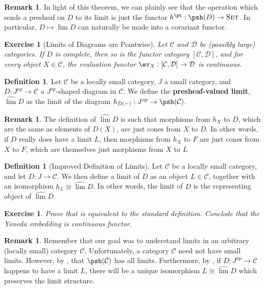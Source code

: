 \documentclass[11pt]{article}
\theoremstyle{plain}
\newtheorem{exrc}[thm]{Exercise}
\theoremstyle{definition}
\newtheorem{defn}[thm]{Definition}
\newtheorem{remk}[thm]{Remark}
\newcommand{\s}[1]{\mathcal{#1}}
\newcommand{\Set}{{\textsc{Set}}}
\begin{document}
\begin{remk}
    In light of this theorem, we can plainly see that the operation which sends a presheaf on $D$ to its limit is just the functor $h^\pt : \psh(D) \to \Set$. In particular, $D \mapsto \lim D$ can naturally be made into a covariant functor.
\end{remk}

\begin{exrc}[Limits of Diagrams are Pointwise] 
    \cite[Proposition 8.8]{awodey}
    Let $\s C$ and $\s D$ be (possibly large) categories. If $D$ is complete, then so is the functor category $[\s C,\s D]$, and for every object $X \in \s C$, the evaluation functor $\ev_X : [\s C, \s D] \to \s D$ is continuous.
\end{exrc}

\begin{defn}
    Let $\s C$ be a locally small category, $J$ a small category, and $D : J^{op} \to \s C$ a $J^{op}$-shaped diagram in $\s C$. We define the \textbf{presheaf-valued limit}, $\widehat{\lim}D$ as the limit of the diagram $h_{D(-)} : J^{op} \to \psh(\s C)$.
\end{defn}

\begin{remk}
    The definition of $\widehat{\lim}D$ is such that morphisms from $h_X$ to $D$, which are the same as elements of $D(X)$, are just cones from $X$ to $D$. In other words, if $D$ really does have a limit $L$, then morphisms from $h_X$ to $F$ are just cones from $X$ to $F$, which are themselves just morphisms from $X$ to $L$
\end{remk}

\begin{defn}[Improved Definition of Limits]
    Let $\s C$ be a locally small category, and let $D : J \to \s C$. We then define a limit of $D$ as an object $L \in \s C$, together with an isomorphism $h_L \cong \widehat{\lim}D$. In other words, the limit of $D$ is the representing object of $\widehat{\lim} D$.
\end{defn}

\begin{exrc}
    Prove that  is equivalent to the standard definition. Conclode that the Yoneda embedding is continuous functor.
\end{exrc}

\begin{remk}
    Remember that our goal was to understand limits in an arbitrary (locally small) category $\s C$. Unfortunately, a category $\s C$ need not have small limits. However, by , that $\psh(\s C)$ has all limits. Furthermore, by , if $D : J^{op} \to \s C$ happens to have a limit $L$, there will be a unique isomorphism $L \cong \widehat{\lim}D$ which preserves the limit structure.
\end{remk}
\end{document}
